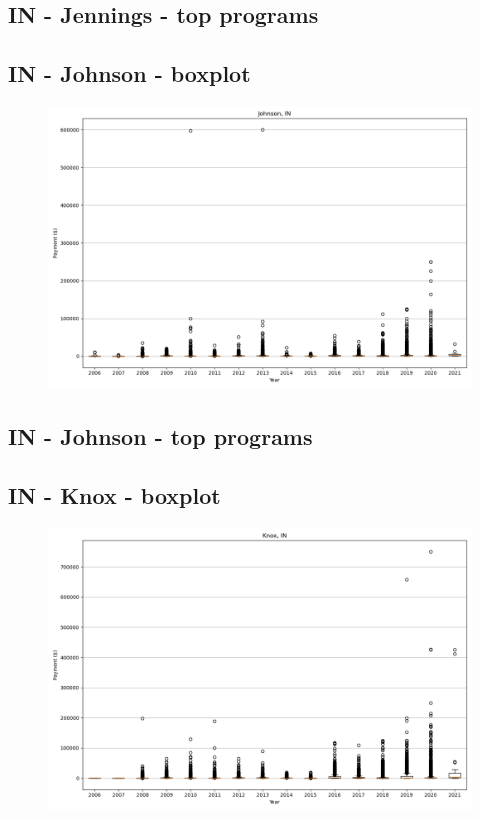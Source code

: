 \subsection*{IN - Jennings - top programs}

\newpage
\subsection*{IN - Johnson - boxplot}
\begin{figure}[h]
\centering
\includegraphics[width=7in]{../output/boxplots/counties/Johnson-IN_boxplot.png}
\end{figure}


\subsection*{IN - Johnson - top programs}

\newpage
\subsection*{IN - Knox - boxplot}
\begin{figure}[h]
\centering
\includegraphics[width=7in]{../output/boxplots/counties/Knox-IN_boxplot.png}
\end{figure}


